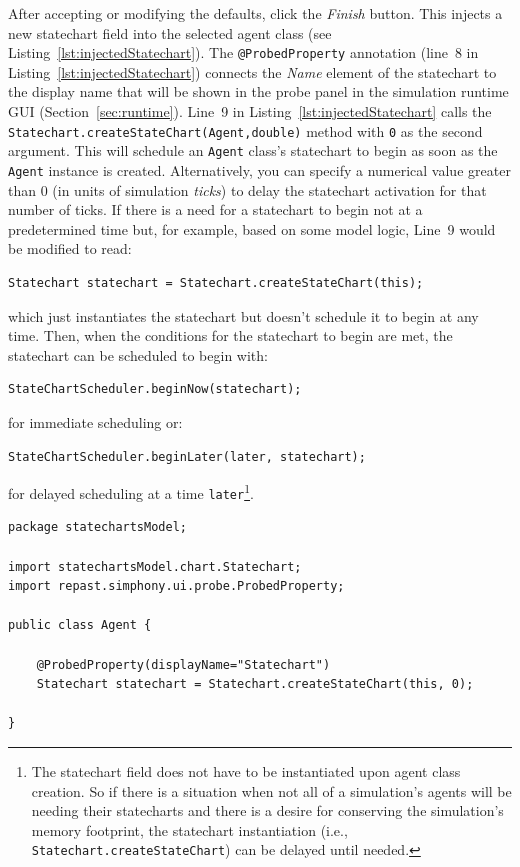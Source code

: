 \documentclass[11pt]{amsart}
\begin{document}
After accepting or modifying the defaults, click the \emph{Finish} button. This injects a new statechart field into the selected agent class (see Listing~\ref{lst:injectedStatechart}). The \texttt{@ProbedProperty} annotation (line~8 in Listing~\ref{lst:injectedStatechart}) connects the \emph{Name} element of the statechart to the display name that will be shown in the probe panel in the simulation runtime GUI (Section~\ref{sec:runtime}). Line~9 in Listing~\ref{lst:injectedStatechart} calls the \texttt{Statechart.createStateChart(Agent,double)} method with \texttt{0} as the second argument. This will schedule an \texttt{Agent} class's statechart to begin as soon as the \texttt{Agent} instance  is created. Alternatively, you can specify a numerical value greater than 0 (in units of simulation \emph{ticks}) to delay the statechart activation for that number of ticks. If there is a need for a statechart to begin not at a predetermined time but, for example, based on some model logic, Line~9 would be modified to read:
\begin{verbatim}Statechart statechart = Statechart.createStateChart(this);\end{verbatim}
which just instantiates the statechart but doesn't schedule it to begin at any time. Then, when the conditions for the statechart to begin are met, the statechart can be scheduled to begin with:
\begin{verbatim}StateChartScheduler.beginNow(statechart);\end{verbatim}
for immediate scheduling or:
\begin{verbatim}StateChartScheduler.beginLater(later, statechart);\end{verbatim}
for delayed scheduling at a time \texttt{later}\footnote{The statechart field does not have to be instantiated upon agent class creation. So if there is a  situation when not all of a simulation's agents will be needing their statecharts and there is a desire for conserving the simulation's memory footprint, the statechart instantiation (i.e., \texttt{Statechart.createStateChart}) can be delayed until needed.}.

\noindent\begin{minipage}[h]{\textwidth}
\vspace{.2in}
\lstset{language=java,caption=Agent class with the default injected statechart field.,label=lst:injectedStatechart}
\begin{lstlisting}
package statechartsModel;

import statechartsModel.chart.Statechart;
import repast.simphony.ui.probe.ProbedProperty;

public class Agent {

	@ProbedProperty(displayName="Statechart")
	Statechart statechart = Statechart.createStateChart(this, 0);

}
\end{lstlisting}
\vspace{.2in}
\end{minipage}
\end{document}
